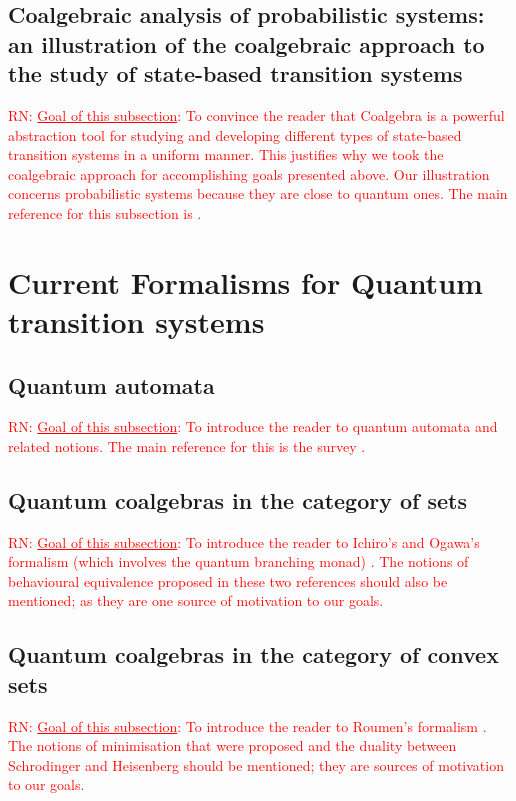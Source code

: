 \documentclass[a4paper, 11pt]{article}
\newcommand{\nevComment}[1]{\textcolor{red}{RN: #1}}
\begin{document}
\subsection{Coalgebraic analysis of probabilistic systems: an
  illustration of the coalgebraic approach to the study of state-based
  transition systems}

\nevComment{\underline{Goal of this subsection}: To convince the
  reader that Coalgebra is a powerful abstraction tool for studying
  and developing different types of state-based transition systems in
  a uniform manner.  This justifies why we took the coalgebraic
  approach for accomplishing goals presented above. Our illustration
  concerns probabilistic systems because they are close to quantum
  ones. The main reference for this subsection is \cite{sokolova}.}


\section{Current Formalisms for Quantum transition systems}

\subsection{Quantum automata}

\nevComment{\underline{Goal of this subsection}: To introduce the
  reader to quantum automata and related notions. The main reference for this is the
  survey \cite{hirvensalo11}.}

\subsection{Quantum coalgebras in the category of sets}

\nevComment{\underline{Goal of this subsection}: To introduce the
reader to Ichiro's and Ogawa's formalism (which involves the quantum
branching monad) \cite{hasuo17,ogawa14}. The notions of behavioural
equivalence proposed in these two references should also be mentioned; as they are one
source of motivation to our goals.}

\subsection{Quantum coalgebras in the category of convex sets}

\nevComment{\underline{Goal of this subsection}: To introduce the
  reader to Roumen's formalism \cite{F14}. The notions of minimisation
  that were proposed and the duality between Schrodinger and Heisenberg should
  be mentioned; they are sources of motivation to our goals.}
\end{document}
